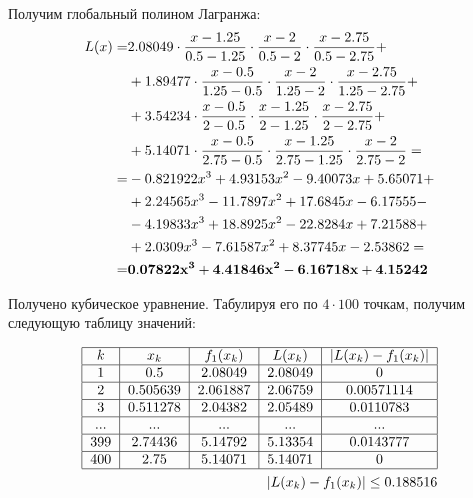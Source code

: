 \documentclass[a4paper, 14pt]{article}
\begin{document}
Получим глобальный полином Лагранжа:
\nopagebreak
\begin{equation}
    \begin{split}
    L(x) = & 2.08049\cdot\frac{x-1.25}{0.5-1.25}\cdot\frac{x-2}{0.5-2}\cdot\frac{x-2.75}{0.5-2.75} +\\
    &+ 1.89477\cdot\frac{x-0.5}{1.25-0.5}\cdot\frac{x-2}{1.25-2}\cdot\frac{x-2.75}{1.25-2.75} +\\
    &+ 3.54234\cdot\frac{x-0.5}{2-0.5}\cdot\frac{x-1.25}{2-1.25}\cdot\frac{x-2.75}{2-2.75} +\\
    &+ 5.14071\cdot\frac{x-0.5}{2.75-0.5}\cdot\frac{x-1.25}{2.75-1.25}\cdot\frac{x-2}{2.75-2} =\\
    = & -0.821922 x^3 + 4.93153 x^2 - 9.40073 x + 5.65071 +\\
    &+ 2.24565 x^3 - 11.7897 x^2 + 17.6845 x - 6.17555 -\\
    &- 4.19833 x^3 + 18.8925 x^2 - 22.8284 x + 7.21588 +\\
    &+ 2.0309 x^3 - 7.61587 x^2 + 8.37745 x - 2.53862 = \\
    = & \bf 0.07822 x^3 + 4.41846 x^2 - 6.16718 x + 4.15242
    \end{split}
\end{equation}

Получено кубическое уравнение. Табулируя его по $4\cdot100$ точкам, получим следующую таблицу значений:

\begin{align}
    \begin{tabular}{|c|c|c|c|c|}
        \hline
        $k$ & $x_k$ & $f_1(x_k)$ & $L(x_k)$ & $|L(x_k)-f_1(x_k)|$ \\
        \hline
        1 & 0.5      & 2.08049 & 2.08049 & 0 \\
        \hline
        2 & 0.505639 & 2.061887& 2.06759 &  0.00571114 \\
        \hline
        3 & 0.511278 & 2.04382 & 2.05489 &  0.0110783 \\
        \hline
        ... & ... & ... & ... &  ... \\
        \hline
        399 & 2.74436   & 5.14792 & 5.13354 & 0.0143777 \\
        \hline
        400 & 2.75 & 5.14071  & 5.14071 &  0 \\
        \hline
    \end{tabular}\\
    |L(x_k)-f_1(x_k)| \le 0.188516
\end{align}
\end{document}
